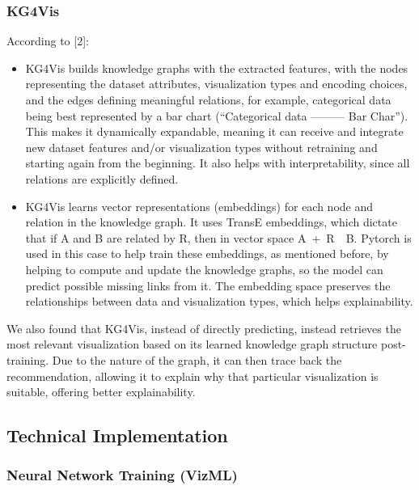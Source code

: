 \subsubsection{KG4Vis}
According to [2]:
\begin{itemize}
    \item KG4Vis builds knowledge graphs with the extracted features, with the nodes representing the dataset attributes, visualization types and encoding choices, and the edges defining meaningful relations, for example, categorical data being best represented by a bar chart (“Categorical data ——— Bar Char”). This makes it dynamically expandable, meaning it can receive and integrate new dataset features and/or visualization types without retraining and starting again from the beginning. It also helps with interpretability, since all relations are explicitly defined.

\item KG4Vis learns vector representations (embeddings) for each node and relation in the knowledge graph. It uses TransE embeddings, which dictate that if A and B are related by R, then in vector space A~+~R~\lowtilde\lowtilde~B.
Pytorch is used in this case to help train these embeddings, as mentioned before, by helping to compute and update the knowledge graphs, so the model can predict possible missing links from it.
The embedding space preserves the relationships between data and visualization types, which helps explainability.
\end{itemize}

We also found that KG4Vis, instead of directly predicting, instead retrieves the most relevant visualization based on its learned knowledge graph structure post-training.
Due to the nature of the graph, it can then trace back the recommendation, allowing it to explain why that particular visualization is suitable, offering better explainability.





\subsection{Technical Implementation}

\subsubsection{Neural Network Training (VizML)}

